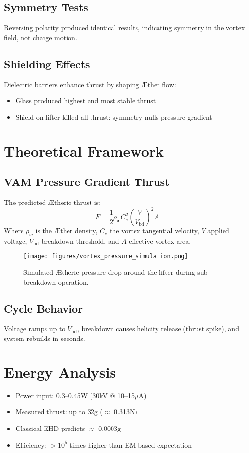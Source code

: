\subsection{Symmetry Tests}
Reversing polarity produced identical results, indicating symmetry in the vortex field, not charge motion.

\subsection{Shielding Effects}
Dielectric barriers enhance thrust by shaping Æther flow:
\begin{itemize}
    \item Glass produced highest and most stable thrust
    \item Shield-on-lifter killed all thrust: symmetry nulls pressure gradient
\end{itemize}

\section{Theoretical Framework}
\subsection{VAM Pressure Gradient Thrust}
The predicted Ætheric thrust is:
\begin{equation}
    F = \frac{1}{2} \rho_\text{\ae} C_e^2 \left( \frac{V}{V_\text{bd}} \right)^2 A
\end{equation}
Where $\rho_\text{\ae}$ is the Æther density, $C_e$ the vortex tangential velocity, $V$ applied voltage, $V_\text{bd}$ breakdown threshold, and $A$ effective vortex area.

\begin{figure}[h!]
    \centering
    \texttt{[image: figures/vortex\_pressure\_simulation.png]}
    \caption{Simulated Ætheric pressure drop around the lifter during sub-breakdown operation.}
\end{figure}

\subsection{Cycle Behavior}
Voltage ramps up to $V_\text{bd}$, breakdown causes helicity release (thrust spike), and system rebuilds in seconds.

\section{Energy Analysis}
\begin{itemize}
    \item Power input: 0.3--0.45W (30kV @ 10--15$\mu$A)
    \item Measured thrust: up to 32g ($\approx$ 0.313N)
    \item Classical EHD predicts $\approx$ 0.0003g
    \item Efficiency: $>10^5$ times higher than EM-based expectation
\end{itemize}

